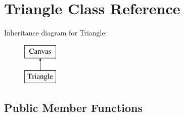 \hypertarget{class_triangle}{\section{Triangle Class Reference}
\label{class_triangle}
}
Inheritance diagram for Triangle\-:\begin{figure}[H]
\begin{center}
\leavevmode
\includegraphics[height=2.000000cm]{class_triangle}
\end{center}
\end{figure}
\subsection*{Public Member Functions}
